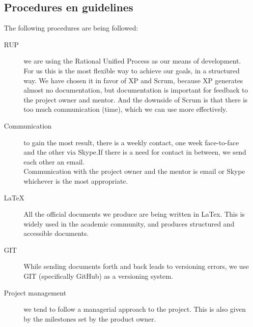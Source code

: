 \documentclass{article}
\begin{document}
\subsection{Procedures en guidelines}
The following procedures are being followed:
\begin{description}
  \item[RUP] we are using the Rational Unified Process as our means of development. For us this is the most flexible way to achieve our goals, in a structured way. We have chosen it in favor of XP and Scrum, because XP generates almost no documentation, but documentation is important for feedback to the project owner and mentor. And the downside of Scrum is that there is too much communication (time), which we can use more effectively.
  \item[Communication] to gain the most result, there is a weekly contact, one week face-to-face and the other via Skype.If there is a need for contact in between, we send each other an email.\\
Communication with the project owner and the mentor is email or Skype whichever is the most appropriate.
  \item[LaTeX] All the official documents we produce are being written in LaTex. This is widely used in the academic community, and produces structured and accessible documents.
  \item[GIT] While sending documents forth and back leads to versioning errors, we use GIT (specifically GitHub) as a versioning system.
  \item[Project management] we tend to follow a managerial approach to the project. This is also given by the milestones set by the product owner.
\end{description}
\end{document}

